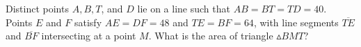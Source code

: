 Distinct points $A,B, T$, and $D$ lie on a line such that $AB = BT = TD = 40$. Points $E$ and $F$ satisfy $AE = DF = 48$ and $TE = BF = 64$, with line segments $\overline{TE}$ and $\overline{BF}$ intersecting at a point $M$. What is the area of triangle $\vartriangle BMT$?
